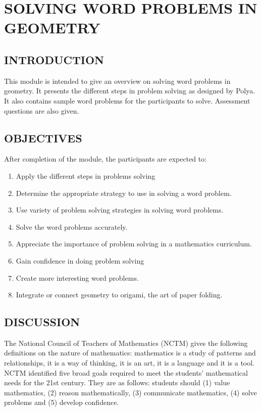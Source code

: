\chapter{SOLVING WORD PROBLEMS IN GEOMETRY}
\section*{INTRODUCTION}
This module is intended to give an overview on solving word problems in geometry. It presents
the different steps in problem solving as designed by Polya. It also contains sample word problems for
the participants to solve. Assessment questions are also given.
\section*{OBJECTIVES}
After completion of the module, the participants are expected to:
\begin{enumerate}
\item Apply the different steps in problems solving
\item Determine the appropriate strategy to use in solving a word problem.
\item Use variety of problem solving strategies in solving word problems.
\item Solve the word problems accurately.
\item Appreciate the importance of problem solving in a mathematics curriculum.
\item Gain confidence in doing problem solving
\item Create more interesting word problems.
\item Integrate or connect geometry to origami, the art of paper folding.
\end{enumerate}
\section*{DISCUSSION}
The National Council of Teachers of Mathematics (NCTM) gives the following definitions on the
nature of mathematics: mathematics is a study of patterns and relationships, it is a way of thinking, it is
an art, it is a language and it is a tool. NCTM identified five broad goals required to meet the students’
mathematical needs for the 21st century. They are as follows: students should (1) value mathematics,
(2) reason mathematically, (3) communicate mathematics, (4) solve problems and (5) develop
confidence.

